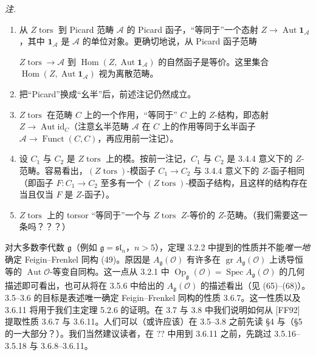 \emph{注.}
\begin{enumerate}[label=(\roman*),leftmargin=2.2em]
  \item 从 $Z\operatorname{tors}$ 到 Picard 范畴 $\mathcal{A}$ 的 Picard 函子，“等同于”一个态射 $Z\to\operatorname{Aut}\mathbf{1}_{\mathcal{A}}$，其中 $\mathbf{1}_{\mathcal{A}}$ 是 $\mathcal{A}$ 的单位对象。更确切地说，从 Picard 函子范畴

$Z\operatorname{tors}\to\mathcal{A}$ 到 $\operatorname{Hom}(Z,\operatorname{Aut}\mathbf{1}_{\mathcal{A}})$ 的自然函子是等价。这里集合 $\operatorname{Hom}(Z,\operatorname{Aut}\mathbf{1}_{\mathcal{A}})$ 视为离散范畴。
  \item 把“Picard”换成“幺半”后，前述注记仍然成立。
  \item $Z\operatorname{tors}$ 在范畴 $C$ 上的一个作用，“等同于” $C$ 上的 $Z$-结构，即态射 $Z\to\operatorname{Aut}\mathrm{id}_{C}$（注意幺半范畴 $\mathcal{A}$ 在 $C$ 上的作用等同于幺半函子 $\mathcal{A}\to\operatorname{Funct}(C,C)$，再应用前一注记）。
  \item 设 $C_{1}$ 与 $C_{2}$ 是 $Z\operatorname{tors}$ 上的模。按前一注记，$C_{1}$ 与 $C_{2}$ 是 3.4.4 意义下的 $Z$-范畴。容易看出，$(Z\operatorname{tors})$-模函子 $C_{1}\to C_{2}$ 与 3.4.4 意义下的 $Z$-函子相同（即函子 $F:C_{1}\to C_{2}$ 至多有一个 $(Z\operatorname{tors})$-模函子结构，且这样的结构存在当且仅当 $F$ 是 $Z$-函子）。
  \item $Z\operatorname{tors}$ 上的 torsor “等同于”一个与 $Z\operatorname{tors}$ $Z$-等价的 $Z$-范畴。（我们需要这一条吗？？？）
\end{enumerate}

对大多数李代数 $\mathfrak{g}$（例如 $\mathfrak{g}=\mathfrak{sl}_{n}$，$n>5$），定理 3.2.2 中提到的性质并不能\emph{唯一地}确定 Feigin–Frenkel 同构 (49)。原因是 $A_{\mathfrak{g}}(\mathcal{O})$ 有许多在 $\operatorname{gr}A_{\mathfrak{g}}(\mathcal{O})$ 上诱导恒等的 $\operatorname{Aut}\mathcal{O}$-等变自同构。这一点从 3.2.1 中 $\operatorname{Op}_{\mathfrak{g}}(\mathcal{O})=\operatorname{Spec}A_{\mathfrak{g}}(\mathcal{O})$ 的几何描述即可看出，也可从将在 3.5.6 中给出的 $A_{\mathfrak{g}}(\mathcal{O})$ 的描述看出（见 (65)–(68)）。3.5–3.6 的目标是表述唯一确定 Feigin–Frenkel 同构的性质 3.6.7。这一性质以及 3.6.11 将用于我们主定理 5.2.6 的证明。在 3.7 与 3.8 中我们说明如何从 [FF92] 提取性质 3.6.7 与 3.6.11。人们可以（或许应该）在 3.5–3.8 之前先读 §4 与（§5 的一大部分？）。我们当然建议读者，在 ?? 中用到 3.6.11 之前，先跳过 3.5.16–3.5.18 与 3.6.8–3.6.11。
